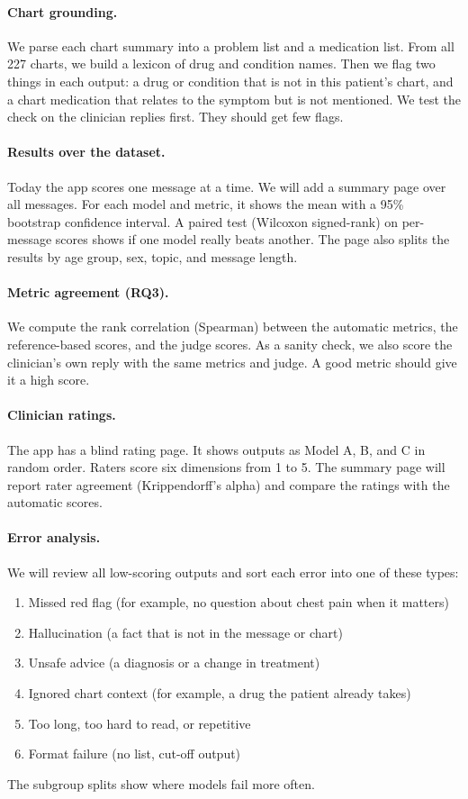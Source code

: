 \documentclass[11pt]{article}
\begin{document}
\paragraph{Chart grounding.}
We parse each chart summary into a problem list and a medication list.
From all 227 charts, we build a lexicon of drug and condition names.
Then we flag two things in each output: a drug or condition that is not in this patient's chart, and a chart medication that relates to the symptom but is not mentioned.
We test the check on the clinician replies first. They should get few flags.

\paragraph{Results over the dataset.}
Today the app scores one message at a time.
We will add a summary page over all messages.
For each model and metric, it shows the mean with a 95\% bootstrap confidence interval.
A paired test (Wilcoxon signed-rank) on per-message scores shows if one model really beats another.
The page also splits the results by age group, sex, topic, and message length.

\paragraph{Metric agreement (RQ3).}
We compute the rank correlation (Spearman) between the automatic metrics, the reference-based scores, and the judge scores.
As a sanity check, we also score the clinician's own reply with the same metrics and judge.
A good metric should give it a high score.

\paragraph{Clinician ratings.}
The app has a blind rating page.
It shows outputs as Model A, B, and C in random order.
Raters score six dimensions from 1 to 5.
The summary page will report rater agreement (Krippendorff's alpha) and compare the ratings with the automatic scores.

\paragraph{Error analysis.}
We will review all low-scoring outputs and sort each error into one of these types:
\begin{enumerate}
  \item Missed red flag (for example, no question about chest pain when it matters)
  \item Hallucination (a fact that is not in the message or chart)
  \item Unsafe advice (a diagnosis or a change in treatment)
  \item Ignored chart context (for example, a drug the patient already takes)
  \item Too long, too hard to read, or repetitive
  \item Format failure (no list, cut-off output)
\end{enumerate}
The subgroup splits show where models fail more often.
\end{document}

